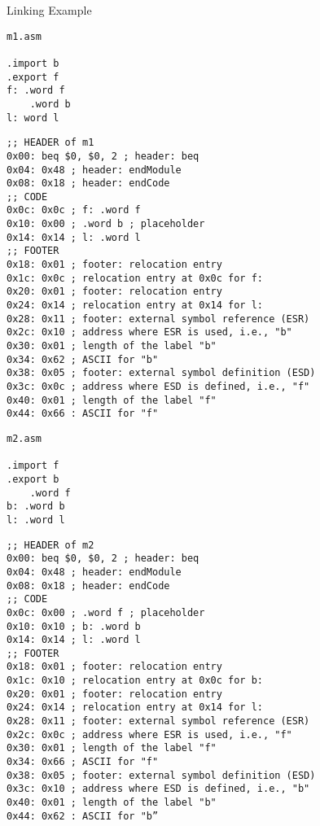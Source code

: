\documentclass{article}
\begin{document}
Linking Example

\begin{tcolorbox}
\begin{verbatim}
m1.asm

.import b
.export f
f: .word f
    .word b
l: word l
\end{verbatim}
\end{tcolorbox}

\begin{tcolorbox}
\begin{verbatim}
;; HEADER of m1
0x00: beq $0, $0, 2 ; header: beq
0x04: 0x48 ; header: endModule
0x08: 0x18 ; header: endCode
;; CODE
0x0c: 0x0c ; f: .word f
0x10: 0x00 ; .word b ; placeholder
0x14: 0x14 ; l: .word l
;; FOOTER
0x18: 0x01 ; footer: relocation entry
0x1c: 0x0c ; relocation entry at 0x0c for f:
0x20: 0x01 ; footer: relocation entry
0x24: 0x14 ; relocation entry at 0x14 for l:
0x28: 0x11 ; footer: external symbol reference (ESR)
0x2c: 0x10 ; address where ESR is used, i.e., "b"
0x30: 0x01 ; length of the label "b"
0x34: 0x62 ; ASCII for "b"
0x38: 0x05 ; footer: external symbol definition (ESD)
0x3c: 0x0c ; address where ESD is defined, i.e., "f"
0x40: 0x01 ; length of the label "f"
0x44: 0x66 : ASCII for "f"
\end{verbatim}
\end{tcolorbox}

\begin{tcolorbox}
\begin{verbatim}
m2.asm

.import f
.export b
    .word f
b: .word b
l: .word l
\end{verbatim}
\end{tcolorbox}

\begin{tcolorbox}
\begin{verbatim}
;; HEADER of m2
0x00: beq $0, $0, 2 ; header: beq
0x04: 0x48 ; header: endModule
0x08: 0x18 ; header: endCode
;; CODE
0x0c: 0x00 ; .word f ; placeholder
0x10: 0x10 ; b: .word b
0x14: 0x14 ; l: .word l
;; FOOTER
0x18: 0x01 ; footer: relocation entry
0x1c: 0x10 ; relocation entry at 0x0c for b:
0x20: 0x01 ; footer: relocation entry
0x24: 0x14 ; relocation entry at 0x14 for l:
0x28: 0x11 ; footer: external symbol reference (ESR)
0x2c: 0x0c ; address where ESR is used, i.e., "f"
0x30: 0x01 ; length of the label "f"
0x34: 0x66 ; ASCII for "f"
0x38: 0x05 ; footer: external symbol definition (ESD)
0x3c: 0x10 ; address where ESD is defined, i.e., "b"
0x40: 0x01 ; length of the label "b"
0x44: 0x62 : ASCII for "b” 
\end{verbatim}
\end{tcolorbox}
\end{document}

